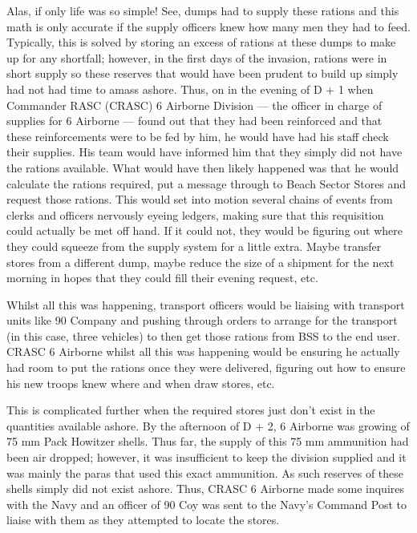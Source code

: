 \documentclass[noraggedright]{turabian-researchpaper}
\begin{document}
Alas, if only life was so simple!  See, dumps had to supply these rations
and this math is only accurate if the supply officers knew how many men they
had to feed.  Typically, this is solved by storing an excess of rations at 
these dumps to make up for any shortfall; however, in the first days of the
invasion, rations were in short supply so these reserves that would have 
been prudent to build up simply had not had time to amass ashore.  Thus, on
in the evening of D + 1 when Commander RASC (CRASC) 6 Airborne Division --- 
the officer in charge of supplies for 6 Airborne
--- found out that they had been reinforced and that these reinforcements 
were to be fed by him, he would have had his staff check their supplies.  
His team would have informed him that they simply did not have the rations 
available.\autocite[6]{90wdjun}
  What would have then likely happened was that he would calculate 
the rations required, put a message through to Beach Sector Stores and request 
those rations.  This would set into motion several chains of events from 
clerks and officers nervously eyeing ledgers, making sure that this requisition
could actually be met off hand.  If it could not, they would be figuring out 
where they could squeeze from the supply system for a little extra.  Maybe
transfer stores from a different dump, maybe reduce the size of a shipment for
the next morning in hopes that they could fill their evening request, etc.  

Whilst all this was happening, transport officers would be liaising with 
transport units like 90 Company and pushing through orders to arrange for 
the transport (in this case, three vehicles) to then get those rations from
BSS to the end user.  CRASC 6 Airborne whilst all this was happening would be
ensuring he actually had room to put the rations once they were delivered, 
figuring out how to ensure his new troops knew where and when draw stores,
etc.  

This is complicated further when the required stores just don't exist in the
quantities available ashore.  By the afternoon of D + 2, 6 Airborne was 
growing of 75 mm Pack Howitzer shells.  Thus far, the supply of this 75 mm 
ammunition had been air dropped; however, it was insufficient to keep the
division supplied and it was mainly the paras that used this exact ammunition.  
As such reserves of these shells simply did not exist ashore.  Thus, CRASC 6
Airborne made some inquires with the Navy and an officer of 90 Coy was sent to 
the Navy's Command Post to liaise with them as they attempted to locate the 
stores.\autocite[7]{90wdjun}
\end{document}

